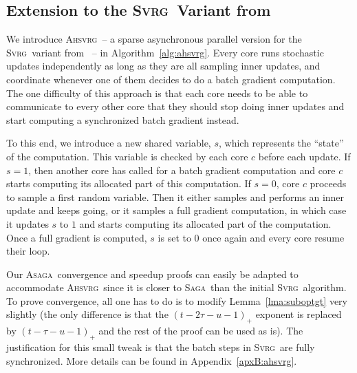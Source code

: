 \documentclass[twoside, 11pt]{article}
\newcommand{\overlap}{\tau}
\newcommand{\ASAGA}{\textsc{Asaga}}
\newcommand{\SAGA}{\textsc{Saga}}
\newcommand{\SVRG}{\textsc{Svrg}}
\newcommand{\AHSVRG}{\textsc{Ahsvrg}}
\begin{document}
\subsection{Extension to the \SVRG\ Variant from~\citet{qsaga}}\label{apx:SVRGext}
We introduce \AHSVRG\ -- a sparse asynchronous parallel version for the \SVRG\ variant from~\citet{qsaga} -- in Algorithm~\ref{alg:ahsvrg}.
Every core runs stochastic updates independently as long as they are all sampling inner updates, and coordinate whenever one of them decides to do a batch gradient computation.
The one difficulty of this approach is that each core needs to be able to communicate to every other core that they should stop doing inner updates and start computing a synchronized batch gradient instead.

To this end, we introduce a new shared variable, $s$, which represents the ``state'' of the computation.
This variable is checked by each core $c$ before each update.
If $s = 1$, then another core has called for a batch gradient computation and core $c$ starts computing its allocated part of this computation.
If $s = 0$, core $c$ proceeds to sample a first random variable.
Then it either samples and performs an inner update and keeps going, or it samples a full gradient computation, in which case it updates $s$ to $1$ and starts computing its allocated part of the computation.
Once a full gradient is computed, $s$ is set to $0$ once again and every core resume their loop.

Our \ASAGA\ convergence and speedup proofs can easily be adapted to accommodate \AHSVRG\ since it is closer to \SAGA\ than the initial \SVRG\ algorithm.
To prove convergence, all one has to do is to modify Lemma~\ref{lma:suboptgt} very slightly (the only difference is that the $(t -2\overlap -u -1)_+$ exponent is replaced by $(t - \overlap - u - 1)_+$ and the rest of the proof can be used as is).
The justification for this small tweak is that the batch steps in \SVRG\ are fully synchronized. More details can be found in Appendix~\ref{apxB:ahsvrg}.
\end{document}
